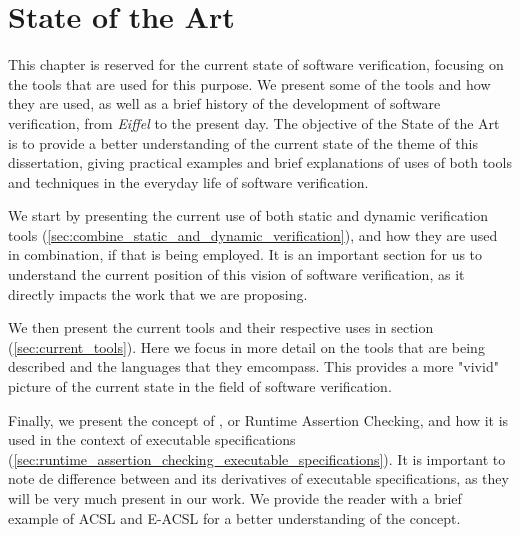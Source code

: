 
%

\makeatletter
\newcommand{\ntifpkgloaded}{%
  \@ifpackageloaded%
}
\makeatother


\chapter{State of the Art}
\label{cha:state_of_the_art}

This chapter is reserved for the current state of software verification,
focusing on the tools that are used for this purpose. We present some 
of the tools and how they are used, as well as a brief history of the 
development of software verification, from \textit{Eiffel} to the present day.
The objective of the State of the Art is to provide a better understanding 
of the current state of the theme of this dissertation, giving practical 
examples and brief explanations of uses of both tools and techniques 
in the everyday life of software verification.

We start by presenting the current use of both static and dynamic verification tools 
(\ref{sec:combine_static_and_dynamic_verification}), and how they are used in 
combination, if that is being employed. It is an important section for us 
to understand the current position of this vision of software verification, as 
it directly impacts the work that we are proposing.

We then present the current tools and their respective uses in section
(\ref{sec:current_tools}). Here we focus in more detail on the tools that are 
being described and the languages that they emcompass. This provides a more 
"vivid" picture of the current state in the field of software verification.

Finally, we present the concept of \rac, or Runtime Assertion Checking, and how 
it is used in the context of executable specifications 
(\ref{sec:runtime_assertion_checking_executable_specifications}). It is important 
to note de difference between \rac and its derivatives of executable specifications, 
as they will be very much present in our work. We provide the reader with a brief 
example of ACSL and E-ACSL for a better understanding of the concept.

